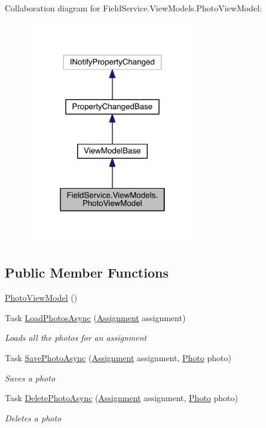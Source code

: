 Collaboration diagram for Field\+Service.\+View\+Models.\+Photo\+View\+Model\+:
\nopagebreak
\begin{figure}[H]
\begin{center}
\leavevmode
\includegraphics[width=210pt]{class_field_service_1_1_view_models_1_1_photo_view_model__coll__graph}
\end{center}
\end{figure}
\subsection*{Public Member Functions}
\begin{DoxyCompactItemize}
\item 
\hyperlink{class_field_service_1_1_view_models_1_1_photo_view_model_ad2b6156f9d51837a1435aa553063663b}{Photo\+View\+Model} ()
\item 
Task \hyperlink{class_field_service_1_1_view_models_1_1_photo_view_model_a546f02701d6f88bdcdaa695b1240662b}{Load\+Photos\+Async} (\hyperlink{class_field_service_1_1_data_1_1_assignment}{Assignment} assignment)
\begin{DoxyCompactList}\small\item\em Loads all the photos for an assignment \end{DoxyCompactList}\item 
Task \hyperlink{class_field_service_1_1_view_models_1_1_photo_view_model_a25a70ad8238bd71d0b6f500b0cf82137}{Save\+Photo\+Async} (\hyperlink{class_field_service_1_1_data_1_1_assignment}{Assignment} assignment, \hyperlink{class_field_service_1_1_data_1_1_photo}{Photo} photo)
\begin{DoxyCompactList}\small\item\em Saves a photo \end{DoxyCompactList}\item 
Task \hyperlink{class_field_service_1_1_view_models_1_1_photo_view_model_ac787c44907d8eb8d70c26ebe9aa6c379}{Delete\+Photo\+Async} (\hyperlink{class_field_service_1_1_data_1_1_assignment}{Assignment} assignment, \hyperlink{class_field_service_1_1_data_1_1_photo}{Photo} photo)
\begin{DoxyCompactList}\small\item\em Deletes a photo \end{DoxyCompactList}\end{DoxyCompactItemize}
